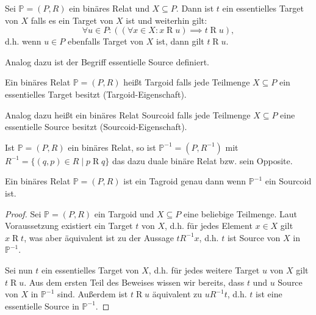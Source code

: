 \documentclass{article}
\begin{document}
\begin{definition}
  Sei $\mathbb{P} = (P, R)$ ein binäres Relat und $X \subseteq P$.
  Dann ist $t$ ein essentielles Target von $X$ falls es ein Target von $X$ ist
  und weiterhin gilt: 
  \begin{equation*}
    \forall u \in P \colon ((\forall x \in X \colon x \mathrel{R} u) \implies t \mathrel{R} u),
  \end{equation*}
  d.h. wenn $u \in P$ ebenfalls Target von $X$ ist, dann gilt $t \mathrel{R} u$.

  Analog dazu ist der Begriff essentielle Source definiert.
\end{definition}

\begin{definition}
  Ein binäres Relat $\mathbb{P} = (P, R)$ heißt Targoid falls
  jede Teilmenge $X \subseteq P$ ein essentielles Target besitzt (Targoid-Eigenschaft).

  Analog dazu heißt ein binäres Relat Sourcoid falls
  jede Teilmenge $X \subseteq P$ eine essentielle Source besitzt (Sourcoid-Eigenschaft).
\end{definition}

\begin{definition}
  Ist $\mathbb{P} = (P, R)$ ein binäres Relat,
  so ist $\mathbb{P}^{-1} = (P, R^{-1})$ mit $R^{-1} = \{ (q, p) \in R \mid p \mathrel{R} q \}$
  das dazu duale binäre Relat bzw. sein Opposite.
\end{definition}

\begin{theorem}
  Ein binäres Relat $\mathbb{P} = (P, R)$ ist ein Tagroid genau dann wenn
  $\mathbb{P}^{-1}$ ein Sourcoid ist.
\end{theorem}
\begin{proof}
  Sei $\mathbb{P} = (P, R)$ ein Targoid und $X \subseteq P$ eine beliebige Teilmenge.
  Laut Voraussetzung existiert ein Target $t$ von $X$, d.h. für jedes Element $x \in X$
  gilt $x \mathrel{R} t$, was aber äquivalent ist zu der Aussage
  $t \mathrel{R^{-1}} x$, d.h. $t$ ist Source von $X$ in $\mathbb{P}^{-1}$.

  Sei nun $t$ ein essentielles Target von $X$, d.h. für jedes weitere Target $u$ von $X$
  gilt $t \mathrel{R} u$.
  Aus dem ersten Teil des Beweises wissen wir bereits,
  dass $t$ und $u$ Source von $X$ in $\mathbb{P}^{-1}$ sind.
  Außerdem ist $t \mathrel{R} u$ äquivalent zu $u \mathrel{R^{-1}} t$,
  d.h. $t$ ist eine essentielle Source in $\mathbb{P}^{-1}$.
\end{proof}
\end{document}
